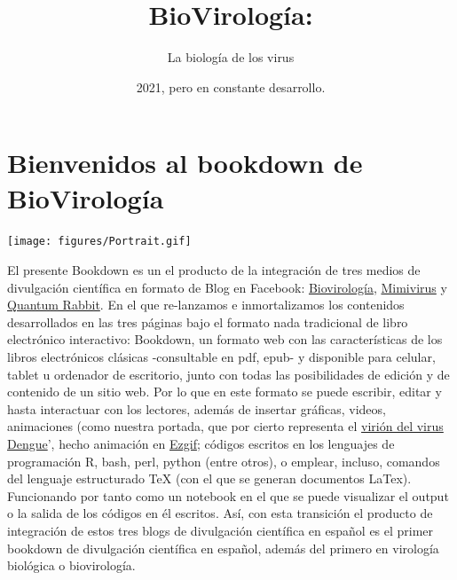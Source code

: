 \documentclass[
  12pt, krantz2,
  spanish,
]{krantz}
\title{BioVirología:}
\subtitle{La biología de los virus}
\author{}
\date{\vspace{-2.5em}2021, pero en constante desarrollo.}
\begin{document}
\maketitle

{
\setcounter{tocdepth}{2}
\tableofcontents
}
\hypertarget{bienvenidos-al-bookdown-de-biovirologuxeda}{%
\section*{Bienvenidos al bookdown de BioVirología}\label{bienvenidos-al-bookdown-de-biovirologuxeda}}

\texttt{[image: figures/Portrait.gif]}

El presente Bookdown es un el producto de la integración de tres medios de divulgación científica en formato de Blog en Facebook: \href{https://www.facebook.com/BioViral/}{Biovirología}, \href{https://www.facebook.com/Mimivirus-100736401569015}{Mimivirus} y \href{https://www.facebook.com/Medicina88}{Quantum Rabbit}. En el que re-lanzamos e inmortalizamos los contenidos desarrollados en las tres páginas bajo el formato nada tradicional de libro electrónico interactivo: Bookdown, un formato web con las características de los libros electrónicos clásicas -consultable en pdf, epub- y disponible para celular, tablet u ordenador de escritorio, junto con todas las posibilidades de edición y de contenido de un sitio web. Por lo que en este formato se puede escribir, editar y hasta interactuar con los lectores, además de insertar gráficas, videos, animaciones (como nuestra portada, que por cierto representa el \href{https://www.ebi.ac.uk/pdbe/entry/search/index/?searchParams=\%7B\%22q_scop_family\%22:\%5B\%7B\%22value\%22:\%22Virus\%20envelope\%20proteins\%22,\%22condition1\%22:\%22AND\%22,\%22condition2\%22:\%22Contains\%22\%7D\%5D,\%22resultState\%22:\%7B\%22tabIndex\%22:0,\%22paginationIndex\%22:1,\%22perPage\%22:\%2210\%22,\%22sortBy\%22:\%22Sort\%20by\%22\%7D\%7D}{virión del virus Dengue}', hecho animación en \href{https://ezgif.com/video-to-gif}{Ezgif}; códigos escritos en los lenguajes de programación R, bash, perl, python (entre otros), o emplear, incluso, comandos del lenguaje estructurado TeX (con el que se generan documentos LaTex). Funcionando por tanto como un notebook en el que se puede visualizar el output o la salida de los códigos en él escritos. Así, con esta transición el producto de integración de estos tres blogs de divulgación científica en español es el primer bookdown de divulgación científica en español, además del primero en virología biológica o biovirología.
\end{document}
